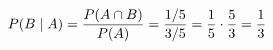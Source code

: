 \documentclass[preview]{standalone}
\begin{document}
\begin{align*}
\special{dvisvgm:raw <g id='unique000'>}P(B\mid A)=\frac{P(A\cap B)}{P(A)}=\frac{1/5}{3/5}=\frac{1}{5}\cdot\frac{5}{3}=\frac{1}{3}\special{dvisvgm:raw </g>}
\end{align*}
\end{document}
